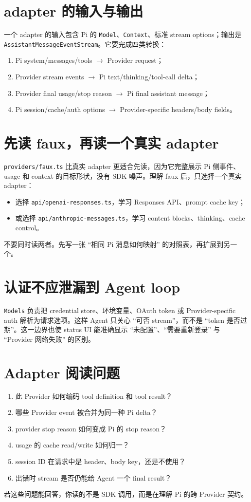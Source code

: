 \documentclass[UTF8,openany,11pt]{ctexbook}
\newcommand{\pathref}[1]{\texttt{#1}}
\begin{document}
\section{adapter 的输入与输出}
一个 adapter 的输入包含 Pi 的 \texttt{Model}、\texttt{Context}、标准 stream options；输出是 \texttt{AssistantMessageEventStream}。它要完成四类转换：
\begin{enumerate}
\item Pi system/messages/tools $\rightarrow$ Provider request；
\item Provider stream events $\rightarrow$ Pi text/thinking/tool-call delta；
\item Provider final usage/stop reason $\rightarrow$ Pi final assistant message；
\item Pi session/cache/auth options $\rightarrow$ Provider-specific headers/body fields。
\end{enumerate}

\section{先读 faux，再读一个真实 adapter}
\pathref{providers/faux.ts} 比真实 adapter 更适合先读，因为它完整展示 Pi 侧事件、usage 和 context 的目标形状，没有 SDK 噪声。理解 faux 后，只选择一个真实 adapter：
\begin{itemize}
\item 选择 \pathref{api/openai-responses.ts}，学习 Responses API、prompt cache key；
\item 或选择 \pathref{api/anthropic-messages.ts}，学习 content blocks、thinking、cache control。
\end{itemize}
不要同时读两者。先写一张 ``相同 Pi 消息如何映射'' 的对照表，再扩展到另一个。

\section{认证不应泄漏到 Agent loop}
\texttt{Models} 负责把 credential store、环境变量、OAuth token 或 Provider-specific auth 解析为请求选项。这样 Agent 只关心 ``可否 stream''，而不是 ``token 是否过期''。这一边界也使 status UI 能准确显示 ``未配置''、``需要重新登录'' 与 ``Provider 网络失败'' 的区别。

\section{Adapter 阅读问题}
\begin{enumerate}
\item 此 Provider 如何编码 tool definition 和 tool result？
\item 哪些 Provider event 被合并为同一种 Pi delta？
\item provider stop reason 如何变成 Pi 的 stop reason？
\item usage 的 cache read/write 如何归一？
\item session ID 在请求中是 header、body key，还是不使用？
\item 出错时 stream 是否仍能给 Agent 一个 final result？
\end{enumerate}
若这些问题能回答，你读的不是 SDK 调用，而是在理解 Pi 的跨 Provider 契约。
\end{document}
